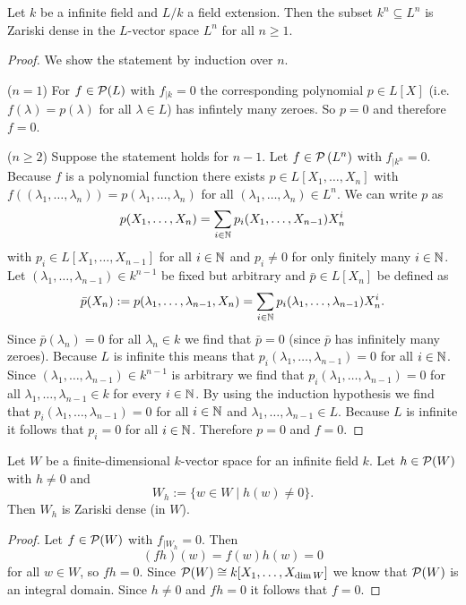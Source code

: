 \begin{lem}
 Let $k$ be a infinite field and $L/k$ a field extension. Then the subset $k^n \subseteq L^n$ is Zariski dense in the $L$-vector space $L^n$ for all $n \geq 1$.
\end{lem}
\begin{proof}
 We show the statement by induction over $n$.
 
 ($n = 1$) For $f \in \mathcal{P}(L)$ with $f_{|k} = 0$ the corresponding polynomial $p \in L[X]$ (i.e.\ $f(\lambda) = p(\lambda)$ for all $\lambda \in L$) has infintely many zeroes. So $p = 0$ and therefore $f = 0$.
 
 ($n \geq 2$) Suppose the statement holds for $n-1$. Let $f \in \mathcal{P}\left(L^n\right)$ with $f_{|k^n} = 0$. Because $f$ is a polynomial function there exists $p \in L[X_1, \dotsc, X_n]$ with $f((\lambda_1, \dotsc, \lambda_n)) = p(\lambda_1, \dotsc, \lambda_n)$ for all $(\lambda_1, \dotsc, \lambda_n) \in L^n$. We can write $p$ as
 \[
  p(X_1, \dotsc, X_n) = \sum_{i \in \mathbb{N}} p_i(X_1, \dotsc, X_{n-1}) X_n^i
 \]
 with $p_i \in L[X_1, \dotsc, X_{n-1}]$ for all $i \in \mathbb{N}$ and $p_i \neq 0$ for only finitely many $i \in \mathbb{N}$. Let $(\lambda_1, \dotsc, \lambda_{n-1}) \in k^{n-1}$ be fixed but arbitrary and $\bar{p} \in L[X_n]$ be defined as
 \[
  \bar{p}(X_n) := p(\lambda_1, \dotsc, \lambda_{n-1}, X_n) = \sum_{i \in \mathbb{N}} p_i(\lambda_1, \dotsc, \lambda_{n-1}) X_n^i.
 \]
 Since $\bar{p}(\lambda_n) = 0$ for all $\lambda_n \in k$ we find that $\bar{p} = 0$ (since $\bar{p}$ has infinitely many zeroes). Because $L$ is infinite this means that $p_i(\lambda_1, \dotsc, \lambda_{n-1}) = 0$ for all $i \in \mathbb{N}$. Since $(\lambda_1, \dotsc, \lambda_{n-1}) \in k^{n-1}$ is arbitrary we find that $p_i(\lambda_1, \dotsc, \lambda_{n-1}) = 0$ for all $\lambda_1, \dotsc, \lambda_{n-1} \in k$ for every $i \in \mathbb{N}$. By using the induction hypothesis we find that $p_i(\lambda_1, \dotsc, \lambda_{n-1}) = 0$ for all $i \in \mathbb{N}$ and $\lambda_1, \dotsc, \lambda_{n-1} \in L$. Because $L$ is infinite it follows that $p_i = 0$ for all $i \in \mathbb{N}$. Therefore $p = 0$ and $f = 0$.
\end{proof}


\begin{lem}
 Let $W$ be a finite-dimensional $k$-vector space for an infinite field $k$. Let $h \in \mathcal{P}(W)$ with $h \neq 0$ and
 \[
  W_h := \{w \in W \mid h(w) \neq 0\}.
 \]
 Then $W_h$ is Zariski dense (in $W$).
\end{lem}
\begin{proof}
 Let $f \in \mathcal{P}(W)$ with $f_{|W_h} = 0$. Then
 \[
  (fh)(w) = f(w)h(w) = 0
 \]
 for all $w \in W$, so $fh = 0$. Since $\mathcal{P}(W) \cong k[X_1, \dotsc, X_{\dim W}]$ we know that $\mathcal{P}(W)$ is an integral domain. Since $h \neq 0$ and $fh = 0$ it follows that $f = 0$.
\end{proof}


